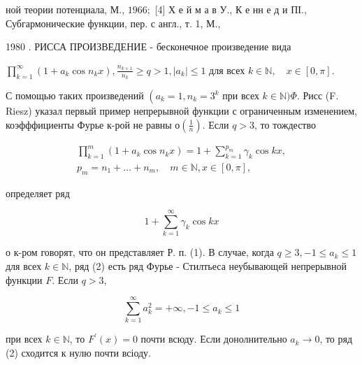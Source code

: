\documentclass[10pt]{article}
\begin{document}
ной теории потенциала, М., $1966 ;$ [4] Х е й м а в У., К е нн е д и ПІ., Субгармонические функции, пер. с англ., т. 1, М.,

1980 . РИССА ПРОИЗВЕДЕНИЕ - бесконечное произведение вида



$\prod_{k=1}^{\infty}\left(1+a_{k} \cos n_{k} x\right), \frac{n_{k+1}}{n_{k}} \geqslant q>1,\left|a_{k}\right| \leqslant 1$ для всех $k \in \mathbb{N}, \quad x \in[0, \pi]$.



С помощью таких произведений $\left(a_{k}=1, n_{k}=3^{k}\right.$ при всех $k \in \mathbb{N}) \Phi$. Рисс (F. Riesz) указал первый пример непрерывной функции с ограниченным изменением, коэфффициенты Фурье к-рой не равны $о\left(\frac{1}{n}\right)$. Если $q>3$, то тождество



\[

\begin{gathered}

\prod_{k=1}^{m}\left(1+a_{k} \cos n_{k} x\right)=1+\sum_{k=1}^{p_{m}} \gamma_{k} \cos k x, \\

p_{m}=n_{1}+\ldots+n_{m}, \quad m \in \mathbb{N}, x \in[0, \pi],

\end{gathered}

\]



определяет ряд



\[

1+\sum_{k=1}^{\infty} \gamma_{k} \cos k x

\]



о к-ром говорят, что он представляет Р. п. (1). В случае, когда $q \geqslant 3,-1 \leqslant a_{k} \leqslant 1$ для всех $k \in \mathbb{N}$, ряд (2) есть ряд Фурье - Стилтьеса неубывающей непрерывной функции $F$. Если $q>3$,



\[

\sum_{k=1}^{\infty} a_{k}^{2}=+\infty,-1 \leqslant a_{k} \leqslant 1

\]



при всех $k \in \mathbb{N}$, то $F^{\prime}(x)=0$ почти всюду. Если донолнительно $a_{k} \rightarrow 0$, то ряд (2) сходится к нулю почти всіоду.
\end{document}
